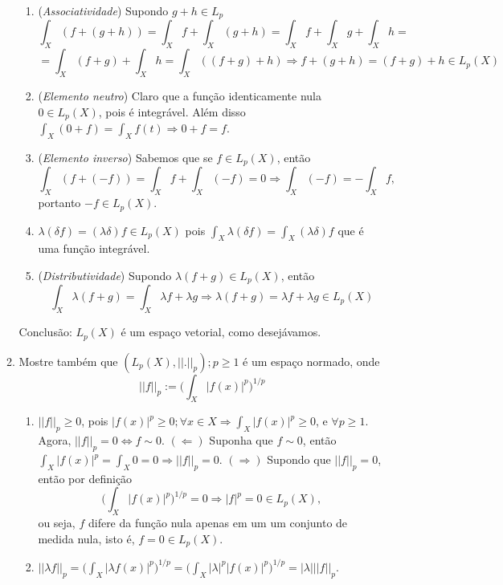 \documentclass{article}
\begin{document}
\begin{enumerate}
\begin{enumerate}
\begin{enumerate}
					\item (\textit{Associatividade}) Supondo $g+h \in L_{p}$
					$$
					\int_{X} (f+(g+h)) = \int_{X} f+ \int_{X}(g+h) = \int_{X} f+ \int_{X} g + \int_{X}h = 
					$$
					$$
					=\int_{X} (f+g) +\int_{X} h = \int_{X}((f+g)+h) \Rightarrow f+(g+h)=(f+g)+h \in L_{p}(X)
					$$
					
					\item (\textit{Elemento neutro}) Claro que a função identicamente nula $0 \in L_{p}(X) $, pois é integrável. Além disso $\int_{X}(0 + f) = \int_{X} f(t) \Rightarrow 0 + f = f$.
					 
					\item (\textit{Elemento inverso}) Sabemos que se $f \in L_{p}(X)$, então 
					$$
					\int_{X}(f + (-f)) = \int_{X} f +\int_{X}(-f)  = 0 \Rightarrow \int_{X}(-f) = - \int_{X}f, 
					$$
					portanto $-f \in L_{p}(X)$.
					
					\item $\lambda(\delta f) = (\lambda \delta) f \in L_{p}(X) $ pois  $\int_{X} \lambda(\delta f) = \int_{X} (\lambda\delta)f$ que é uma função integrável.
					
					\item (\textit{Distributividade}) Supondo $\lambda (f+g) \in L_{p}(X) $, então
					$$
					\int_{X} \lambda (f+g) = \int_{X} \lambda f+ \lambda g \Rightarrow \lambda (f+g)  = \lambda f + \lambda g \in L_{p}(X)
					$$
				\end{enumerate}
				Conclusão: $L_{p}(X)$ é um espaço vetorial, como desejávamos.
				
				\item Mostre também que $(L_{p}(X), ||.||_{p}); p \geq 1$ é um espaço normado, onde
					$$
					||f||_{p} := \Big (\int_{X} |f(x)|^{p} \Big )^{1/p}
					$$
					\begin{enumerate}
						\item $||f||_{p} \geq 0$, pois $|f(x)|^{p} \geq 0; \forall x \in X \Rightarrow \int_{X} |f(x)|^{p} \geq 0$, e $\forall p \geq 1$. Agora, $||f||_{p} = 0 \iff f \sim 0$. $(\Leftarrow)$ Suponha que $f \sim 0$, então $\int_{X} |f(x)|^{p} = \int_{X} 0 = 0 \Rightarrow ||f||_{p} = 0$. $(\Rightarrow)$ Supondo que $||f||_{p} = 0$, então por definição 
						$$
						\Big (\int_{X} |f(x)|^{p} \Big )^{1/p} = 0 \Rightarrow |f|^{p} =0 \in  L_{p}(X), 
						$$
						ou seja, $f$ difere da função nula apenas em um um conjunto de medida nula, isto é, $f = 0 \in  L_{p}(X)$.
						
						\item $||\lambda f||_{p} = \Big ( \int_{X} |\lambda f(x)|^{p} \Big )^{1/p} = \Big ( \int_{X} |\lambda|^{p}| f(x)|^{p} \Big )^{1/p} = |\lambda|||f||_{p}$.
						

\end{enumerate}
\end{enumerate}
\end{enumerate}
\end{document}
